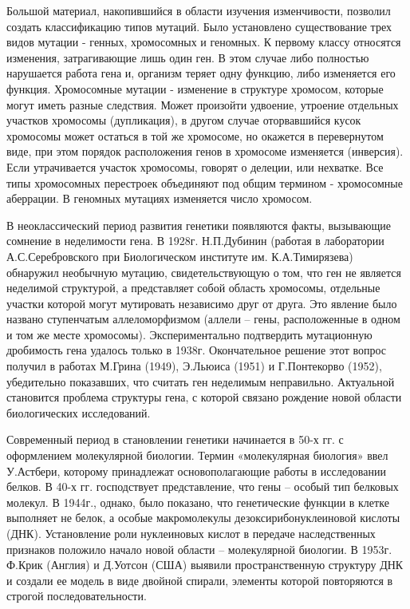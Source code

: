 \documentclass[exam_answers.tex]{subfiles}
\begin{document}
Большой материал, накопившийся в области изучения изменчивости,
позволил создать классификацию типов мутаций. Было установлено
существование трех видов мутации - генных, хромосомных и геномных.
К первому классу относятся изменения, затрагивающие лишь один ген. В этом
случае либо полностью нарушается работа гена и, организм теряет одну
функцию, либо изменяется его функция. Хромосомные мутации - изменение в
структуре хромосом, которые могут иметь разные следствия. Может произойти
удвоение, утроение отдельных участков хромосомы (дупликация), в другом
случае оторвавшийся кусок хромосомы может остаться в той же хромосоме, но
окажется в перевернутом виде, при этом порядок расположения генов в
хромосоме изменяется (инверсия). Если утрачивается участок хромосомы,
говорят о делеции, или нехватке. Все типы хромосомных перестроек
объединяют под общим термином - хромосомные аберрации. В геномных
мутациях изменяется число хромосом.

В неоклассический период развития генетики появляются факты,
вызывающие сомнение в неделимости гена. В 1928г. Н.П.Дубинин (работая в
лаборатории А.С.Серебровского при Биологическом институте им.
К.А.Тимирязева) обнаружил необычную мутацию, свидетельствующую о том,
что ген не является неделимой структурой, а представляет собой область
хромосомы, отдельные участки которой могут мутировать независимо друг от
друга. Это явление было названо ступенчатым аллеломорфизмом (аллели –
гены, расположенные в одном и том же месте хромосомы). Экспериментально
подтвердить мутационную дробимость гена удалось только в 1938г.
Окончательное решение этот вопрос получил в работах М.Грина (1949),
Э.Льюиса (1951) и Г.Понтекорво (1952), убедительно показавших, что считать
ген неделимым неправильно. Актуальной становится проблема структуры гена,
с которой связано рождение новой области биологических исследований.

Современный период в становлении генетики начинается в 50-х гг. с
оформлением молекулярной биологии. Термин «молекулярная биология» ввел
У.Астбери, которому принадлежат основополагающие работы в исследовании
белков. В 40-х гг. господствует представление, что гены – особый тип
белковых молекул. В 1944г., однако, было показано, что генетические функции
в клетке выполняет не белок, а особые макромолекулы
дезоксирибонуклеиновой кислоты (ДНК). Установление роли нуклеиновых
кислот в передаче наследственных признаков положило начало новой области –
молекулярной биологии. В 1953г. Ф.Крик (Англия) и Д.Уотсон (США) выявили
пространственную структуру ДНК и создали ее модель в виде двойной
спирали, элементы которой повторяются в строгой последовательности.
\end{document}
